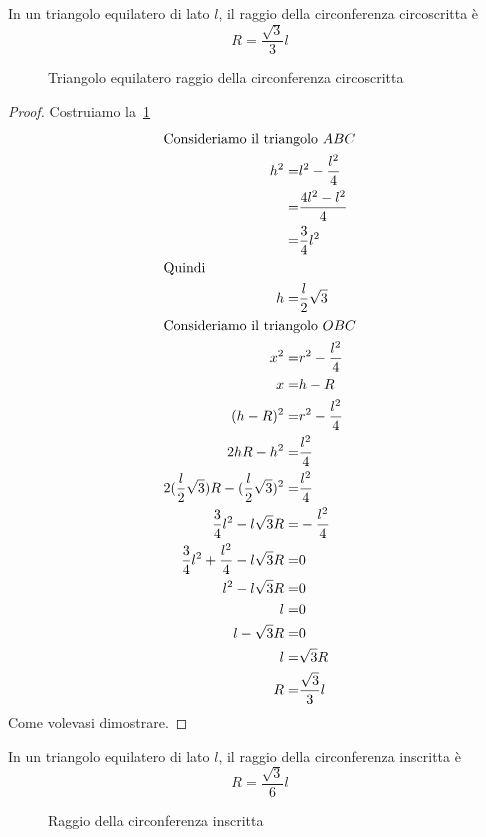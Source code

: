 \begin{thm}\label{thm:raggiocirconferenzacircoscritta}
	In un triangolo equilatero di lato $l$, il raggio della circonferenza circoscritta è \[R=\dfrac{\sqrt{3}}{3}l\]
\end{thm}
\begin{figure}
	\centering
	
	\caption{Triangolo equilatero raggio della circonferenza circoscritta}
	\label{fig:raggiocirconferenzacircoscritta}
\end{figure}
\begin{proof}
	Costruiamo la~\cref{fig:raggiocirconferenzacircoscritta}
	\begin{align*}
		\intertext{Consideriamo il triangolo $ABC$}
		h^2=&l^2-\dfrac{l^2}{4}\\
		=&\dfrac{4l^2-l^2}{4}\\
		=&\dfrac{3}{4}l^2\\
		\intertext{Quindi}
		h=&\dfrac{l}{2}\sqrt{3}\\
		\intertext{Consideriamo il triangolo $OBC$}
		x^2=&r^2-\dfrac{l^2}{4}\\
		x=&h-R\\
		(h-R)^2=&r^2-\dfrac{l^2}{4}\\
		2hR-h^2=&\dfrac{l^2}{4}\\
		2(\dfrac{l}{2}\sqrt{3})R-(\dfrac{l}{2}\sqrt{3})^2=&\dfrac{l^2}{4}\\
		\dfrac{3}{4}l^2-l\sqrt{3}R=&-\dfrac{l^2}{4}\\
		\dfrac{3}{4}l^2+\dfrac{l^2}{4}-l\sqrt{3}R=&0\\
		l^2-l\sqrt{3}R=&0\\
		l=&0\\
		l-\sqrt{3}R=&0\\
		l=&\sqrt{3}R\\
		R=&\dfrac{\sqrt{3}}{3}l
	\end{align*}
	Come volevasi dimostrare.
\end{proof}
\begin{thm}\label{thm:raggiocirconferenzainscritta}
	In un triangolo equilatero di lato $l$, il raggio della circonferenza inscritta è \[R=\dfrac{\sqrt{3}}{6}l\]
\end{thm}
\begin{figure}
	\centering
	
	\caption{Raggio della circonferenza inscritta}
	\label{fig:raggiocirconferenzainscritta}
\end{figure}
